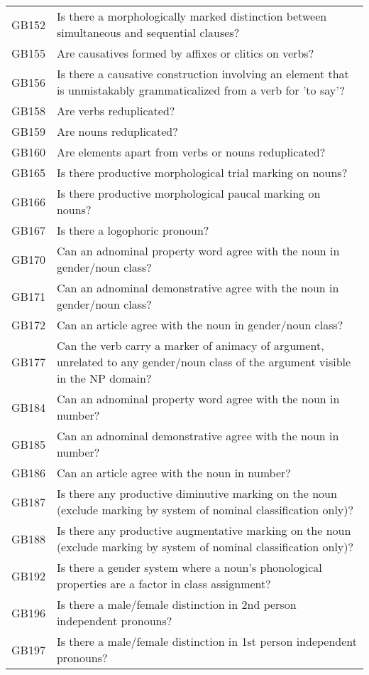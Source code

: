 \begin{longtable}{p{3cm}p{12cm}}
  GB152 & Is there a morphologically marked distinction between simultaneous and sequential clauses? \\ 
  GB155 & Are causatives formed by affixes or clitics on verbs? \\ 
  GB156 & Is there a causative construction involving an element that is unmistakably grammaticalized from a verb for 'to say'? \\ 
  GB158 & Are verbs reduplicated? \\ 
  GB159 & Are nouns reduplicated? \\ 
  GB160 & Are elements apart from verbs or nouns reduplicated? \\ 
  GB165 & Is there productive morphological trial marking on nouns? \\ 
  GB166 & Is there productive morphological paucal marking on nouns? \\ 
  GB167 & Is there a logophoric pronoun? \\ 
  GB170 & Can an adnominal property word agree with the noun in gender/noun class? \\ 
  GB171 & Can an adnominal demonstrative agree with the noun in gender/noun class? \\ 
  GB172 & Can an article agree with the noun in gender/noun class? \\ 
  GB177 & Can the verb carry a marker of animacy of argument, unrelated to any gender/noun class of the argument visible in the NP domain? \\ 
  GB184 & Can an adnominal property word agree with the noun in number? \\ 
  GB185 & Can an adnominal demonstrative agree with the noun in number? \\ 
  GB186 & Can an article agree with the noun in number? \\ 
  GB187 & Is there any productive diminutive marking on the noun (exclude marking by system of nominal classification only)? \\ 
  GB188 & Is there any productive augmentative marking on the noun (exclude marking by system of nominal classification only)? \\ 
  GB192 & Is there a gender system where a noun's phonological properties are a factor in class assignment? \\ 
  GB196 & Is there a male/female distinction in 2nd person independent pronouns? \\ 
  GB197 & Is there a male/female distinction in 1st person independent pronouns? \\ 

\end{longtable}
